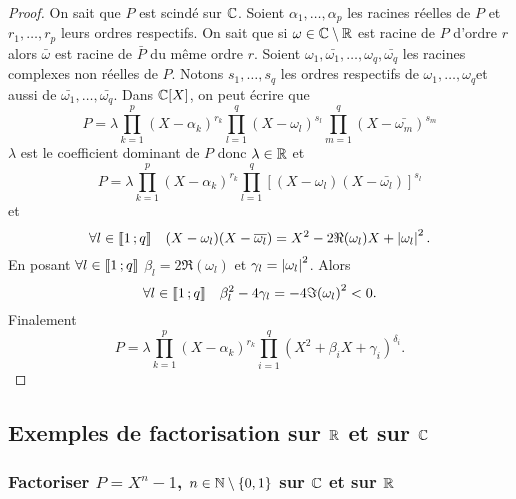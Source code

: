 \begin{proof}
  On sait que \(P\) est scindé sur \(\mathbb{C}\). Soient \(\alpha_1, \ldots, \alpha_p\)
  les racines réelles de \(P\) et \(r_1, \ldots, r_p\) leurs ordres respectifs.
  On sait que si \(\omega \in \mathbb{C}\setminus\mathbb{R}\) est racine de \(P\) d'ordre \(r\)
  alors \(\bar{\omega}\) est racine de \(\bar{P}\) du même ordre \(r\).
  Soient \(\omega_1, \bar{\omega_1}, \ldots, \omega_q, \bar{\omega_q}\) les
  racines complexes non réelles de \(P\). Notons \(s_1, \ldots, s_q\) les ordres
  respectifs de \(\omega_1, \ldots, \omega_q\)et aussi de \(\bar{\omega_1},
  \ldots, \bar{\omega_q}\). Dans \(\mathbb{C}[X]\), on peut écrire que
  \begin{equation}
    P = \lambda \prod_{k = 1}^p (X-\alpha_k)^{r_k} \prod_{l = 1}^q (X-\omega_l)^{s_l}
    \prod_{m = 1}^q (X-\bar{\omega_m})^{s_m}
  \end{equation}
  \(\lambda\) est le coefficient dominant de \(P\) donc \(\lambda \in \mathbb{R}\) et
  \begin{equation}
    P = \lambda \prod_{k = 1}^p (X-\alpha_k)^{r_k} \prod_{l = 1}^q
    {[(X-\omega_l)(X-\bar{\omega_l})]}^{s_l}
  \end{equation}
  et \begin{equation}
    \forall l \in \mathopen{\llbracket}1\mathclose{}\mathpunct{};q\mathclose{\rrbracket} \quad (X-\omega_l)(X-\overline{\omega_l}) =
    X^2 -2\Re(\omega_l)X + \left\lvert\omega_l\right\rvert^2.
  \end{equation}
  En posant \(\forall l \in \mathopen{\llbracket}1\mathclose{}\mathpunct{};q\mathclose{\rrbracket}\) \(\beta_l =
  2\Re(\omega_l)\) et \(\gamma_l = \left\lvert\omega_l\right\rvert^2\). Alors
  \begin{equation}
    \forall l \in \mathopen{\llbracket}1\mathclose{}\mathpunct{};q\mathclose{\rrbracket} \quad \beta_l^2 -4\gamma_l =
    -4{\Im(\omega_l)}^2 < 0.
  \end{equation}
  Finalement
  \begin{equation}
    P = \lambda \prod_{k = 1}^p {(X-{\alpha}_k)}^{r_k} \prod_{i = 1}^q
    {(X^2+{\beta}_{i}X+{\gamma}_i)}^{\delta_i}.
  \end{equation}
\end{proof}

\subsection{Exemples de factorisation sur \(\mathbb{R}\) et sur \(\mathbb{C}\)}

\subsubsection{Factoriser \(P = X^n-1\), \(n \in \mathbb{N}\setminus\{0,1\}\) sur \(\mathbb{C}\)
et sur \(\mathbb{R}\)}

